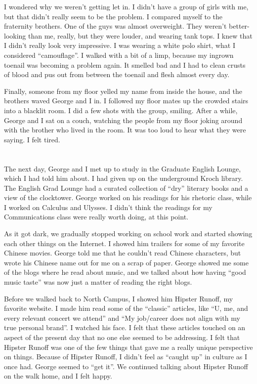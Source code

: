 I wondered why we weren't getting let in.  I didn't have a group of girls with
me, but that didn't really seem to be the problem.  I compared myself to the
fraternity brothers.  One of the guys was almost overweight.  They weren't
better-looking than me, really, but they were louder, and wearing tank tops.  I
knew that I didn't really look very impressive.  I was wearing a white polo
shirt, what I considered ``camouflage''.  I walked with a bit of a limp, because
my ingrown toenail was becoming a problem again.  It smelled bad and I had to
clean crusts of blood and pus out from between the toenail and flesh almost
every day.

Finally, someone from my floor yelled my name from inside the house, and the
brothers waved George and I in.  I followed my floor mates up the crowded stairs
into a blacklit room.  I did a few shots with the group, smiling.  After a
while, George and I sat on a couch, watching the people from my floor joking
around with the brother who lived in the room.  It was too loud to hear what
they were saying.  I felt tired.

\section{}

The next day, George and I met up to study in the Graduate English Lounge, which
I had told him about.  I had given up on the underground Kroch library.  The
English Grad Lounge  had a curated collection of ``dry'' literary books and a
view of the clocktower.  George worked on his readings for his rhetoric class,
while I worked on Calculus and Ulysses.  I didn't think the readings for my
Communications class were really worth doing, at this point.

As it got dark, we gradually stopped working on school work and started showing
each other things on the Internet.  I showed him trailers for some of my
favorite Chinese movies.  George told me that he couldn't read Chinese
characters, but wrote his Chinese name out for me on a scrap of paper.  George
showed me some of the blogs where he read about music, and we talked about how
having ``good music taste'' was now just a matter of reading the right blogs.  

Before we walked back to North Campus, I showed him Hipster Runoff, my favorite
website.  I made him read some of the ``classic'' articles, like ``U, me, and
every relevant concert we attend'' and ``My job/career does not align with my
true personal brand''.  I watched his face.  I felt that these articles touched
on an aspect of the present day that no one else seemed to be addressing.  I
felt that Hipster Runoff was one of the few things that gave me a really unique
perspective on things.  Because of Hipster Runoff, I didn't feel as ``caught
up'' in culture as I once had.   George seemed to ``get it''.   We continued
talking about Hipster Runoff on the walk home, and I felt happy.

